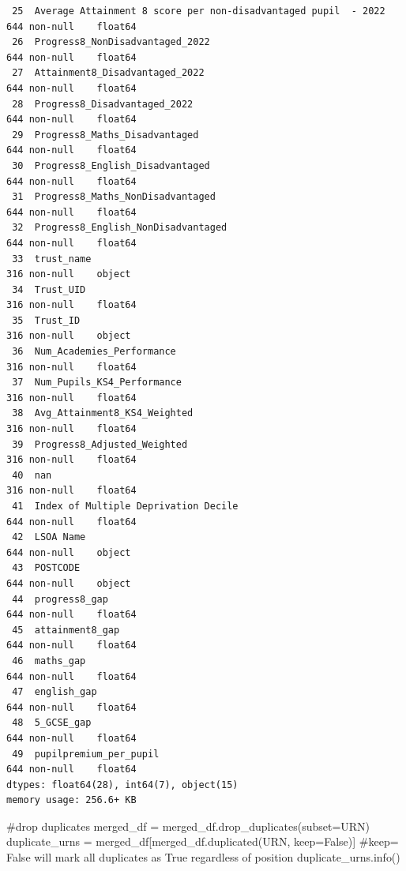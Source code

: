 \documentclass[
  letterpaper,
  DIV=11,
  numbers=noendperiod]{scrartcl}
\newenvironment{Shaded}{\begin{snugshade}}{\end{snugshade}}
\newcommand{\CommentTok}[1]{\textcolor[rgb]{0.37,0.37,0.37}{#1}}
\newcommand{\NormalTok}[1]{\textcolor[rgb]{0.00,0.23,0.31}{#1}}
\newcommand{\OperatorTok}[1]{\textcolor[rgb]{0.37,0.37,0.37}{#1}}
\newcommand{\StringTok}[1]{\textcolor[rgb]{0.13,0.47,0.30}{#1}}
\newcommand{\VariableTok}[1]{\textcolor[rgb]{0.07,0.07,0.07}{#1}}
\begin{document}
\begin{verbatim}
 25  Average Attainment 8 score per non-disadvantaged pupil  - 2022  644 non-null    float64
 26  Progress8_NonDisadvantaged_2022                                 644 non-null    float64
 27  Attainment8_Disadvantaged_2022                                  644 non-null    float64
 28  Progress8_Disadvantaged_2022                                    644 non-null    float64
 29  Progress8_Maths_Disadvantaged                                   644 non-null    float64
 30  Progress8_English_Disadvantaged                                 644 non-null    float64
 31  Progress8_Maths_NonDisadvantaged                                644 non-null    float64
 32  Progress8_English_NonDisadvantaged                              644 non-null    float64
 33  trust_name                                                      316 non-null    object 
 34  Trust_UID                                                       316 non-null    float64
 35  Trust_ID                                                        316 non-null    object 
 36  Num_Academies_Performance                                       316 non-null    float64
 37  Num_Pupils_KS4_Performance                                      316 non-null    float64
 38  Avg_Attainment8_KS4_Weighted                                    316 non-null    float64
 39  Progress8_Adjusted_Weighted                                     316 non-null    float64
 40  nan                                                             316 non-null    float64
 41  Index of Multiple Deprivation Decile                            644 non-null    float64
 42  LSOA Name                                                       644 non-null    object 
 43  POSTCODE                                                        644 non-null    object 
 44  progress8_gap                                                   644 non-null    float64
 45  attainment8_gap                                                 644 non-null    float64
 46  maths_gap                                                       644 non-null    float64
 47  english_gap                                                     644 non-null    float64
 48  5_GCSE_gap                                                      644 non-null    float64
 49  pupilpremium_per_pupil                                          644 non-null    float64
dtypes: float64(28), int64(7), object(15)
memory usage: 256.6+ KB
\end{verbatim}

\begin{Shaded}
\begin{Highlighting}[]
\CommentTok{\#drop duplicates}
\NormalTok{merged\_df }\OperatorTok{=}\NormalTok{ merged\_df.drop\_duplicates(subset}\OperatorTok{=}\StringTok{\textquotesingle{}URN\textquotesingle{}}\NormalTok{)}
\NormalTok{duplicate\_urns }\OperatorTok{=}\NormalTok{ merged\_df[merged\_df.duplicated(}\StringTok{\textquotesingle{}URN\textquotesingle{}}\NormalTok{, keep}\OperatorTok{=}\VariableTok{False}\NormalTok{)] }
\CommentTok{\#keep= False will mark all duplicates as True regardless of position}
\NormalTok{duplicate\_urns.info()}
\end{Highlighting}
\end{Shaded}
\end{document}
